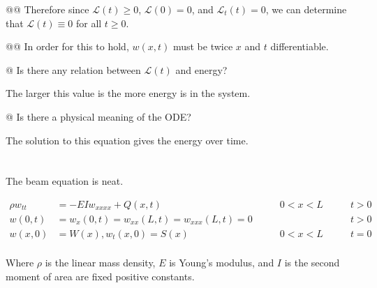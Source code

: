 \documentclass[10pt]{article}
\begin{document}
\begin{easylist}[enumerate]
        @@ Therefore since $\mathcal{L}(t) \ge 0$, $\mathcal{L}(0) = 0$, and $\mathcal{L}_t(t) = 0$, we can determine
        that $\mathcal{L}(t) \equiv 0$ for all $t \ge 0$.

        @@ In order for this to hold, $w(x, t)$ must be twice $x$ and $t$ differentiable.

        @ Is there any relation between $\mathcal{L}(t)$ and energy?

        The larger this value is the more energy is in the system.

        @ Is there a physical meaning of the ODE?

        The solution to this equation gives the energy over time.
    \end{easylist}

\newpage
\section{}

The beam equation is neat.

\begin{align*}
    \rho w_{tt} &= -EI w_{xxxx} + Q(x, t) \qquad & 0 < x < L \qquad & t > 0\\
    w(0, t) &= w_x(0, t) = w_{xx}(L, t) = w_{xxx}(L, t) = 0 \qquad && t > 0\\
    w(x, 0) &= W(x), w_t(x, 0) = S(x) \qquad & 0 < x < L \qquad & t = 0\\
\end{align*}

Where $\rho$ is the linear mass density, $E$ is Young's modulus, and $I$ is the second moment of area are fixed positive
constants.
\end{document}
